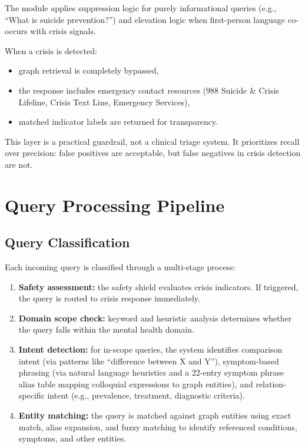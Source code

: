\documentclass[12pt,a4paper]{article}
\begin{document}
The module applies suppression logic for purely informational queries (e.g., ``What is suicide prevention?'') and elevation logic when first-person language co-occurs with crisis signals.

When a crisis is detected:
\begin{itemize}[nosep]
    \item graph retrieval is completely bypassed,
    \item the response includes emergency contact resources (988 Suicide \& Crisis Lifeline, Crisis Text Line, Emergency Services),
    \item matched indicator labels are returned for transparency.
\end{itemize}

This layer is a practical guardrail, not a clinical triage system. It prioritizes recall over precision: false positives are acceptable, but false negatives in crisis detection are not.

\section{Query Processing Pipeline}

\subsection{Query Classification}

Each incoming query is classified through a multi-stage process:

\begin{enumerate}[nosep]
    \item \textbf{Safety assessment:} the safety shield evaluates crisis indicators. If triggered, the query is routed to crisis response immediately.
    \item \textbf{Domain scope check:} keyword and heuristic analysis determines whether the query falls within the mental health domain.
    \item \textbf{Intent detection:} for in-scope queries, the system identifies comparison intent (via patterns like ``difference between X and Y''), symptom-based phrasing (via natural language heuristics and a 22-entry symptom phrase alias table mapping colloquial expressions to graph entities), and relation-specific intent (e.g., prevalence, treatment, diagnostic criteria).
    \item \textbf{Entity matching:} the query is matched against graph entities using exact match, alias expansion, and fuzzy matching to identify referenced conditions, symptoms, and other entities.
\end{enumerate}
\end{document}
